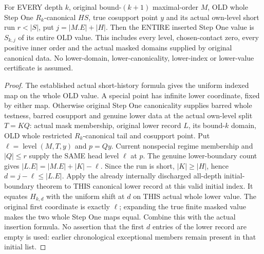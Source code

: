 \begin{theorem}
\label{hir:original-recursive-canonical-short-step-value}
\leanok
For EVERY depth $k$, original bound-$(k+1)$ maximal-order $M$, OLD whole
Step One $R_k$-canonical $HS$, true cosupport point $y$ and its actual own-level
short run $r<|S|$, put $j=|M.E|+|H|$. Then the ENTIRE inserted Step One value is
$S_{k,j}$ of its entire OLD value. This includes every level, chosen-contact
zero, every positive inner order and the actual masked domains supplied by
original canonical data. No lower-domain,
lower-canonicality, lower-index or lower-value certificate is assumed.
\end{theorem}
\begin{proof}
The established actual short-history formula gives the uniform indexed map
on the whole OLD value. A special point has infinite lower coordinate, fixed
by either map. Otherwise original Step One canonicality supplies barred
whole testness, barred cosupport and genuine lower data at the actual own-level
split $T=KQ$: actual mask membership, original lower record $L$, its bound-$k$
domain, OLD whole restricted $R_k$-canonical tail and cosupport point. Put
$\ell=\operatorname{level}(M,T,y)$ and $p=Qy$. Current nonspecial regime
membership and $|Q|\leq r$ supply the SAME head level $\ell$ at $p$.
The genuine lower-boundary count gives $|L.E|=|M.E|+|K|-\ell$.
Since the run is short, $|K|\geq |H|$, hence
$d=j-\ell\leq |L.E|$. Apply the already internally discharged all-depth
initial-boundary theorem to THIS canonical lower record at this valid initial
index. It equates $H_{k,d}$ with the uniform shift at $d$ on THIS actual whole
lower value. The original first coordinate is exactly $\ell$; expanding the
true finite masked value makes the two whole Step One maps equal. Combine
this with the actual insertion formula. No assertion that the first $d$
entries of the lower record are empty is used: earlier chronological
exceptional members remain present in that initial list.
\end{proof}

